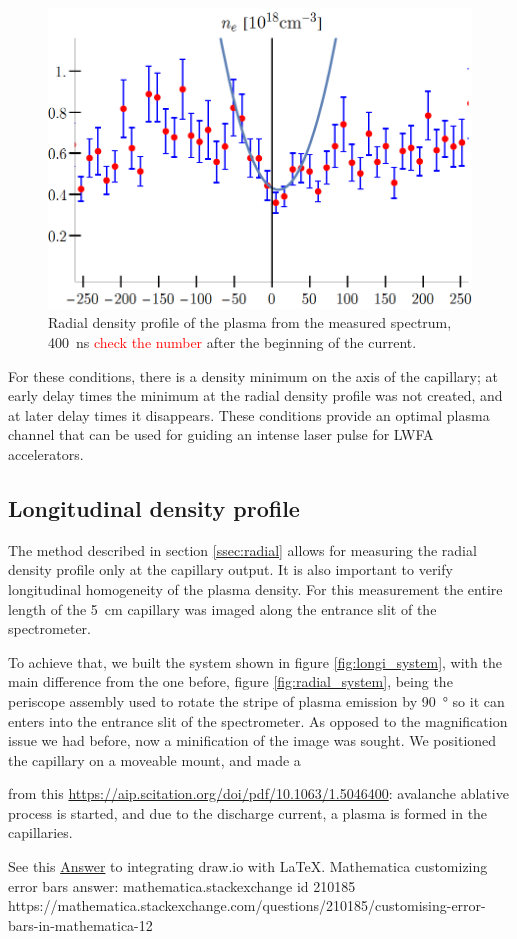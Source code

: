 \documentclass[justified,nofonts,nobib]{tufte-book}
\begin{document}
\begin{figure}
\centering
\includegraphics[width=\textwidth]{figures/spectro/parabolic.png}
    \caption{Radial density profile of the plasma from the measured spectrum, \SI{400}{\ns} \textcolor{red}{check the number} after the beginning of the current.}
    
\label{fig:plasma_channel_spectro}
\end{figure}

For these conditions, there is a density minimum on the axis of the capillary; at early delay times the minimum at the radial density profile was not created, and at later delay times it disappears. These conditions provide an optimal plasma channel that can be used for guiding an intense laser pulse for LWFA accelerators.

\subsection{Longitudinal density profile}\label{ssec:longi}

The method described in section \ref{ssec:radial} allows for measuring the radial density profile only at the capillary output. It is also important to verify longitudinal homogeneity of the plasma density. For this measurement the entire length of the \SI{5}{\cm} capillary was imaged along the entrance slit of the spectrometer.

To achieve that, we built the system shown in figure \ref{fig:longi_system}, with the main difference from the one before, figure \ref{fig:radial_system}, being the periscope assembly used to rotate the stripe of plasma emission by \SI{90}{\degree} so it can enters into the entrance slit of the spectrometer. As opposed to the magnification issue we had before, now a minification of the image was sought. We positioned the capillary on a moveable mount, and made a 


from this \href{article}{https://aip.scitation.org/doi/pdf/10.1063/1.5046400}: avalanche ablative process is started, and due to the discharge current, a plasma is formed in the capillaries.

See this \href{https://tex.stackexchange.com/a/427625}{Answer} to integrating draw.io with LaTeX.
Mathematica customizing error bars answer:
mathematica.stackexchange id 210185
https://mathematica.stackexchange.com/questions/210185/customising-error-bars-in-mathematica-12
\printbibliography
\end{document}
